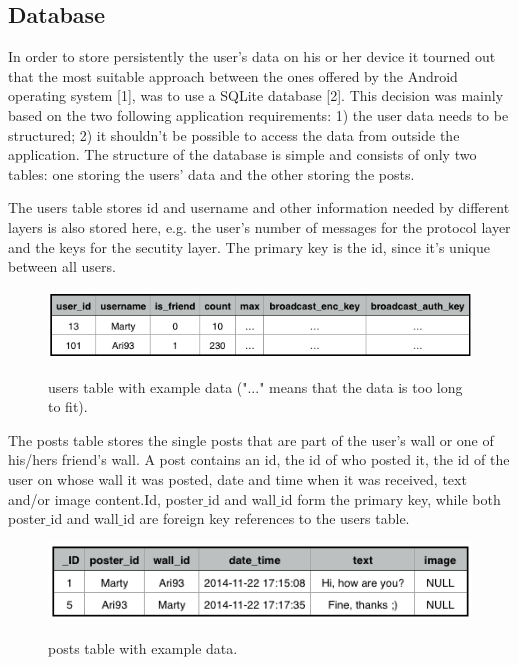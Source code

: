 \documentclass{report}
\newcommand{\lfig}[1]{\label{fig:#1}}
\begin{document}
\subsection{Database}
In order to store persistently the user's data on his or her device it tourned out that the most suitable approach between the ones offered by the Android operating system [1], was to use a SQLite database [2]. This decision was mainly based on the two following application requirements:
1) the user data needs to be structured;
2) it shouldn't be possible to access the data from outside the application.
The structure of the database is simple and consists of only two tables: one storing the users' data and the other storing the posts.

The users table stores id and username and other information needed by different layers is also stored here, e.g. the user's number of messages for the protocol layer and the keys for the secutity layer. The primary key is the id, since it's unique between all users.

\begin{figure}[H]
	\centering
    \includegraphics[width=\columnwidth]{users_table_example.png}
    \lfig{users_table_example}
    \vspace{-5mm} %
	\caption{users table with example data ("..." means that the data is too long to fit).}
\end{figure}

The posts table stores the single posts that are part of the user's wall or one of his/hers friend's wall. 
A post contains an id, the id of who posted it, the id of the user on whose wall it was posted, date and time when it was received, text and/or image content.Id, poster$\_$id and wall$\_$id form the primary key, while both poster$\_$id and wall$\_$id are foreign key references to the users table.

\begin{figure}[H]
	\centering
    \includegraphics[width=\columnwidth]{post_table_example.png}
    \lfig{post_table_example}
    \vspace{-5mm} %
	\caption{posts table with example data.}
\end{figure}
\end{document}
